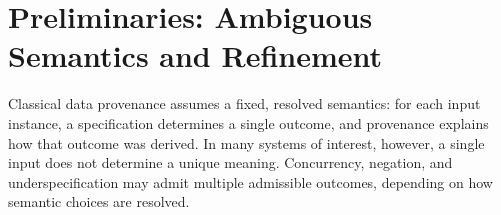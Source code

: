 \documentclass[acmsmall,nonacm]{acmart}
\theoremstyle{remark}
\numberwithin{definition}{section}
\numberwithin{theorem}{section}
\numberwithin{lemma}{section}
\numberwithin{corollary}{section}
\numberwithin{remark}{section}
\numberwithin{example}{section}
\numberwithin{observation}{section}
\numberwithin{assumption}{section}
\begin{document}





\section{Preliminaries: Ambiguous Semantics and Refinement}
\label{sec:prelim}

Classical data provenance assumes a fixed, resolved semantics: for each input
instance, a specification determines a single outcome, and provenance explains
how that outcome was derived.
In many systems of interest, however, a single input does not determine a unique
meaning.
Concurrency, negation, and underspecification may admit multiple admissible
outcomes, depending on how semantic choices are resolved.
\end{document}
